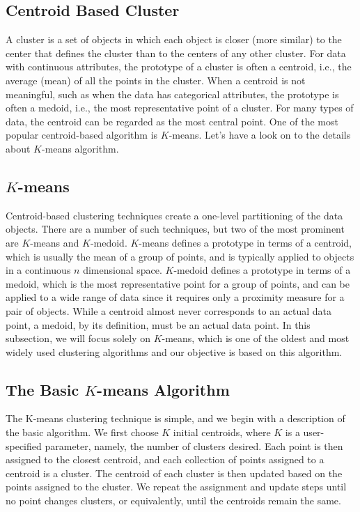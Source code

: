 \subsection{Centroid Based Cluster}
A cluster is a set of objects in which each object is closer
(more similar) to the center that defines the cluster than to the centers
of any other cluster.  For data with continuous attributes, the prototype of a
cluster is often a centroid, i.e., the average (mean) of all the points in the cluster.
When a centroid is not meaningful, such as when the data has categorical
attributes, the prototype is often a medoid, i.e., the most representative point
of a cluster.  For many types of data, the centroid can be regarded as the
most central point. One of the most popular centroid-based algorithm is $K$-means. Let's
have a look on to the details about $K$-means algorithm.

\subsection{$K$-means}
Centroid-based clustering techniques create a one-level partitioning of the
data objects.  There are a number of such techniques, but two of the most
prominent are $K$-means and $K$-medoid. $K$-means defines a prototype in terms
of a centroid, which is usually the mean of a group of points, and is typically
applied to objects in a continuous $n$ dimensional space.  $K$-medoid defines a
prototype in terms of a medoid, which is the most representative point for a
group of points, and can be applied to a wide range of data since it requires
only a proximity measure for a pair of objects. While a centroid almost never
corresponds to an actual data point, a medoid, by its definition, must be an
actual data point.  In this subsection, we will focus solely on $K$-means, which is
one of the oldest and most widely used clustering algorithms and our objective is based on this algorithm.

\subsection{The Basic $K$-means Algorithm}
The K-means clustering technique is simple, and we begin with a description
of the basic algorithm. We first choose $K$ initial centroids, where $K$ is a user-specified
parameter, namely, the number of clusters desired.  Each point is
then assigned to the closest centroid, and each collection of points assigned to
a centroid is a cluster. The centroid of each cluster is then updated based on
the points assigned to the cluster. We repeat the assignment and update steps
until no point changes clusters, or equivalently, until the centroids remain the
same.

